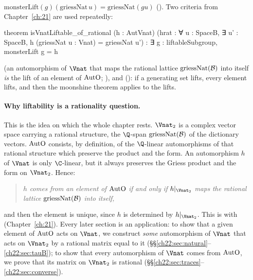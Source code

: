 $\mathrm{monsterLift}(g)(\mathrm{griessNat}\,u)=\mathrm{griessNat}(g u)$ ().  Two
criteria from Chapter~\ref{ch:21} are used repeatedly:
\begin{leancode}
theorem isVnatLiftable_of_rational (h : AutVnat)
    (hrat : ∀ u : SpaceB, ∃ u' : SpaceB, h (griessNat u : Vnat) = griessNat u') :
    ∃ g : liftableSubgroup, monsterLift g = h
\end{leancode}
(an automorphism of $\Vnat$ that maps the rational lattice $\mathrm{griessNat}(\mathcal{B})$ into itself \emph{is} the
lift of an element of $\mathrm{AutO}$; ), and
 (): if a
generating set lifts, every element lifts, and then the moonshine theorem applies to the lifts.

\paragraph{Why liftability is a rationality question.}  This is the idea on which the whole chapter rests.  $\Vnat_2$ is a
complex vector space carrying a rational structure, the $\Q$-span $\mathrm{griessNat}(\mathcal{B})$ of the dictionary
vectors.  $\mathrm{AutO}$ consists, by definition, of the $\Q$-linear automorphisms of that rational structure which
preserve the product and the form.  An automorphism $h$ of $\Vnat$ is only $\C$-linear, but it always preserves the
Griess product and the form on $\Vnat_2$.  Hence:
\begin{quote}
\emph{$h$ comes from an element of $\mathrm{AutO}$ if and only if $h|_{\Vnat_2}$ maps the rational lattice
$\mathrm{griessNat}(\mathcal{B})$ into itself,}
\end{quote}
and then the element is unique, since $h$ is determined by $h|_{\Vnat_2}$.  This is  with
 (Chapter~\ref{ch:21}).  Every later section is an application: to show that a given
element of $\mathrm{AutO}$ acts on $\Vnat$, we construct \emph{some} automorphism of $\Vnat$ that acts on $\Vnat_2$ by a
rational matrix equal to it (\S\S\ref{ch22:sec:natural}--\ref{ch22:sec:tauB}); to show that every automorphism of $\Vnat$ comes
from $\mathrm{AutO}$, we prove that its matrix on $\Vnat_2$ is rational
(\S\S\ref{ch22:sec:traces}--\ref{ch22:sec:converse}).

